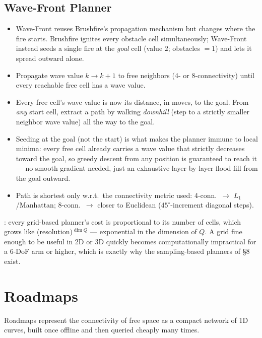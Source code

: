 \subsection{Wave-Front Planner}
\begin{itemize}
\item Wave-Front reuses Brushfire's propagation mechanism but changes where the fire starts. Brushfire ignites every obstacle cell simultaneously; Wave-Front instead seeds a single fire at the \emph{goal} cell (value $2$; obstacles $=1$) and lets it spread outward alone.
\item Propagate wave value $k\to k{+}1$ to free neighbors (4- or 8-connectivity) until every reachable free cell has a wave value.
\item Every free cell's wave value is now its distance, in moves, to the goal. From \emph{any} start cell, extract a path by walking \emph{downhill} (step to a strictly smaller neighbor wave value) all the way to the goal.
\item Seeding at the goal (not the start) is what makes the planner immune to local minima: every free cell already carries a wave value that strictly decreases toward the goal, so greedy descent from any position is guaranteed to reach it --- no smooth gradient needed, just an exhaustive layer-by-layer flood fill from the goal outward.
\item Path is shortest only w.r.t.\ the connectivity metric used: 4-conn.\ $\to$ $L_1$/Manhattan; 8-conn.\ $\to$ closer to Euclidean ($45^\circ$-increment diagonal steps).
\end{itemize}
\begin{democallout}
\end{democallout}

\begin{warnbox}
: every grid-based planner's cost is proportional to its number of cells, which grows like (resolution)$^{\dim Q}$ --- exponential in the dimension of $Q$. A grid fine enough to be useful in 2D or 3D quickly becomes computationally impractical for a 6-DoF arm or higher, which is exactly why the sampling-based planners of \S8 exist.
\end{warnbox}

\section{Roadmaps}
Roadmaps represent the connectivity of free space as a compact network of 1D curves, built once offline and then queried cheaply many times.

